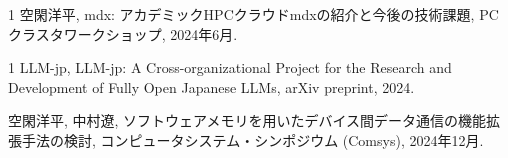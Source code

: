 \begin{招待講演}{1}
空閑洋平, mdx: アカデミックHPCクラウドmdxの紹介と今後の技術課題, PCクラスタワークショップ, 2024年6月.

\end{招待講演}

\begin{発表}{1}
LLM-jp, LLM-jp: A Cross-organizational Project for the Research and Development of Fully Open Japanese LLMs, arXiv preprint, 2024.

空閑洋平, 中村遼, ソフトウェアメモリを用いたデバイス間データ通信の機能拡張手法の検討, コンピュータシステム・シンポジウム (Comsys), 2024年12月.

\end{発表}
